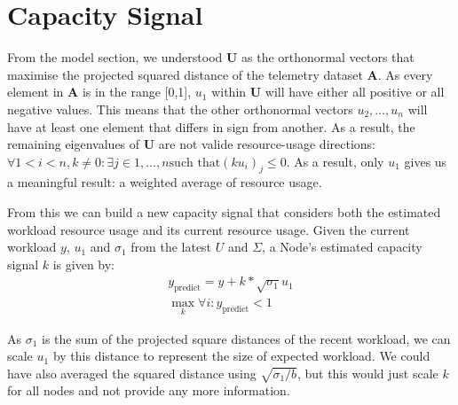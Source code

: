 \section{Capacity Signal}
From the model section, we understood $\textbf{U}$ as the orthonormal vectors
that maximise the projected squared distance of the telemetry dataset
$\mathbf{A}$. As every element in $\mathbf{A}$ is in the range [0,1], $u_1$
within $\mathbf{U}$ will have either all positive or all negative values. This
means that the other orthonormal vectors $u_2, \ldots, u_n$ will have at least
one element that differs in sign from another. As a result, the remaining
eigenvalues of $\mathbf{U}$ are not valide resource-usage directions: $\forall 1
< i < n, k \neq 0: \exists j \in {1,\ldots,n} \text{such that} (ku_i)_j \le 0$.
As a result, only $u_1$ gives us a meaningful result: a weighted average of
resource usage.

From this we can build a new capacity signal that considers both the estimated
workload resource usage and its current resource usage. Given the current
workload $y$, $u_1$ and $\sigma_1$ from the latest $U$ and $\Sigma$, a Node's
estimated capacity signal $k$ is given by:
\begin{align}
    y_{\text{predict}} = y + k * \sqrt{\sigma_1} u_1 \\
    \max_k \forall i: y_{\text{predict}} < 1
\end{align}

As $\sigma_1$ is the sum of the projected square distances of the recent
workload, we can scale $u_1$ by this distance to represent the size of expected
workload. We could have also averaged the squared distance using
$\sqrt{\sigma_1/b}$, but this would just scale $k$ for all nodes and not
provide any more information.

